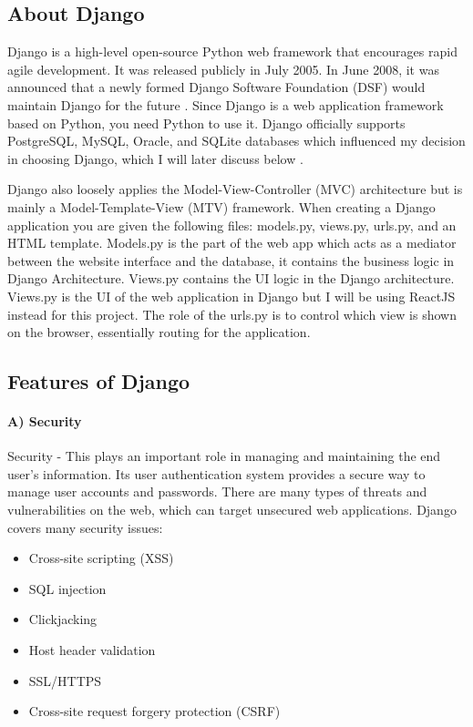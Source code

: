 \subsection{About Django}
Django is a high-level open-source Python web framework that encourages rapid agile development. It was released publicly in July 2005. In June 2008, it was announced that a newly formed Django Software Foundation (DSF) would maintain Django for the future \cite{vainikka2018full}. Since Django is a web application framework based on Python, you need Python to use it. Django officially supports PostgreSQL, MySQL, Oracle, and SQLite databases which influenced my decision in choosing Django, which I will later discuss below \cite{ghimire2020comparative}.

Django also loosely applies the Model-View-Controller (MVC) architecture \cite{ghimire2020comparative} but is mainly a Model-Template-View (MTV) framework. When creating a Django application you are given the following files: models.py, views.py, urls.py, and an HTML template. Models.py is the part of the web app which acts as a mediator between the website interface and the database, it contains the business logic in Django Architecture. Views.py contains the UI logic in the Django architecture. Views.py is the UI of the web application in Django but I will be using ReactJS instead for this project. The role of the urls.py is to control which view is shown on the browser, essentially routing for the application.

\subsection{Features of Django}
\label{marker}
\paragraph{A) Security}
 Security \cite{ghimire2020comparative}- This plays an important role in managing and maintaining the end user's information. Its user authentication system provides a secure way to manage user accounts and passwords. There are many types of threats and vulnerabilities on the web, which can target unsecured web applications. Django covers many security issues:
\begin{itemize}
    \item Cross-site scripting (XSS)
    \item SQL injection
    \item Clickjacking
    \item Host header validation
    \item SSL/HTTPS
    \item Cross-site request forgery protection (CSRF)
\end{itemize}


